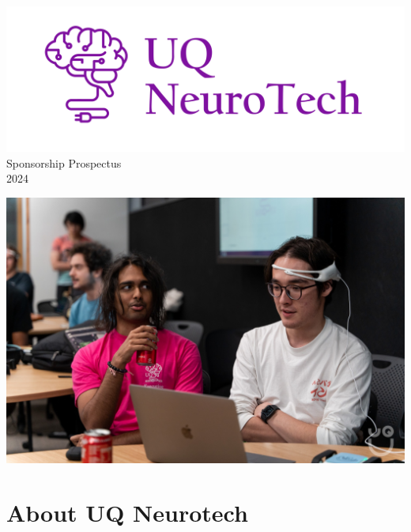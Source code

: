 \documentclass[a4paper,12pt]{report}
\begin{document}
\begin{titlepage}
    \begin{center}
        \vspace*{15mm}
        \includegraphics[width=0.8\paperwidth]{./photos/logo-fullform.png} \\
        \vspace{1cm}
        \Huge Sponsorship Prospectus \\
        \huge \textcolor{turbo_purple}{2024}

        \vspace*{30mm}
        \includegraphics[height=0.32\paperheight]{./photos/emotiv-group-2p.jpg}
        \vfill

    \end{center}
    
\end{titlepage}
\restoregeometry

\section*{About UQ Neurotech}
\end{document}
